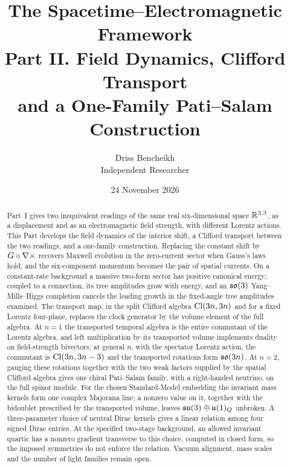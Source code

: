 

\title{\textbf{The Spacetime--Electromagnetic Framework}\\[6pt]
\large Part II. Field Dynamics, Clifford Transport\\[2pt]
and a One-Family Pati--Salam Construction}
\author{Driss Bencheikh\\[2pt]\normalsize Independent Researcher}
\date{24 November 2026}


\maketitle

\begin{abstract}
\noindent
Part~I gives two inequivalent readings of the same real six-dimensional space $\mathbb{R}^{3,3}$, as a displacement and as an electromagnetic field
strength, with different Lorentz actions. This Part develops the field dynamics of the interior shift, a Clifford transport between the two
readings, and a one-family construction. Replacing the constant shift by $G\circ\nabla\times$ recovers Maxwell evolution in the zero-current sector
when Gauss's laws hold, and the six-component momentum becomes the pair of spatial currents. On a constant-rate background a massive two-form
sector has positive canonical energy; coupled to a connection, its tree amplitudes grow with energy, and an $\mathfrak{so}(3)$ Yang--Mills--Higgs
completion cancels the leading growth in the fixed-angle tree amplitudes examined. The transport map, in the split Clifford algebra
$\mathrm{Cl}(3n,3n)$ and for a fixed Lorentz four-plane, replaces the clock generator by the volume element of the full algebra. At $n=1$ the
transported temporal algebra is the entire commutant of the Lorentz algebra, and left multiplication by its transported volume implements
duality on field-strength bivectors; at general $n$, with the spectator Lorentz action, the commutant is $\mathrm{Cl}(3n,3n-3)$ and the transported
rotations form $\mathfrak{so}(3n)$. At $n=2$, gauging these rotations together with the two weak factors supplied by the spatial Clifford algebra gives
one chiral Pati--Salam family, with a right-handed neutrino, on the full spinor module. For the chosen Standard-Model embedding the invariant
mass kernels form one complex Majorana line; a nonzero value on it, together with the bidoublet prescribed by the transported volume, leaves
$\mathfrak{su}(3)\oplus\mathfrak{u}(1)_Q$ unbroken. A three-parameter choice of neutral Dirac kernels gives a linear relation among four signed Dirac entries. At the
specified two-stage background, an allowed invariant quartic has a nonzero gradient transverse to this choice, computed in closed form, so the
imposed symmetries do not enforce the relation. Vacuum alignment, mass scales and the number of light families remain open.


\end{abstract}
